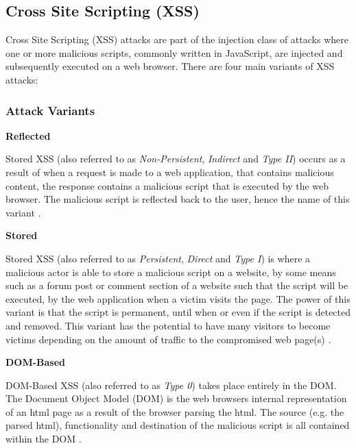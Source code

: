 \documentclass{mscreport}
\begin{document}
\subsection{Cross Site Scripting (XSS)}
\label{subsection:XSS}

Cross Site Scripting (XSS) attacks are part of the injection class of attacks where one or more malicious scripts, commonly written in JavaScript, are injected and subsequently executed on a web browser. There are four main variants of XSS attacks:

\subsubsection{Attack Variants}
\textbf{Reflected}

\vspace{0.2cm} \noindent
Stored XSS (also referred to as \textit{Non-Persistent}, \textit{Indirect} and \textit{Type II}) occurs as a result of when a request is made to a web application, that contains malicious content, the response contains a malicious script that is executed by the web browser. The malicious script is reflected back to the user, hence the name of this variant \cite{Rodriguez2020-bg}.

\vspace{0.6cm} \noindent
\textbf{Stored}

\vspace{0.2cm} \noindent
Stored XSS (also referred to as \textit{Persistent}, \textit{Direct} and \textit{Type I}) is where a malicious actor is able to store a malicious script on a website, by some means such as a forum post or comment section of a website such that the script will be executed, by the web application when a victim visits the page. The power of this variant is that the script is permanent, until when or even if the script is detected and removed. This variant has the potential to have many visitors to become victims depending on the amount of traffic to the compromised web page(s) \cite{Rodriguez2020-bg}.

\vspace{0.6cm} \noindent
\textbf{DOM-Based}

\vspace{0.2cm} \noindent
DOM-Based XSS (also referred to as \textit{Type 0}) takes place entirely in the DOM. The Document Object Model (DOM) is the web browsers internal representation of an html page as a result of the browser parsing the html. The source (e.g. the parsed html), functionality and destination of the malicious script is all contained within the DOM \cite{Rodriguez2020-bg,Klein2005-hx}.
\end{document}
